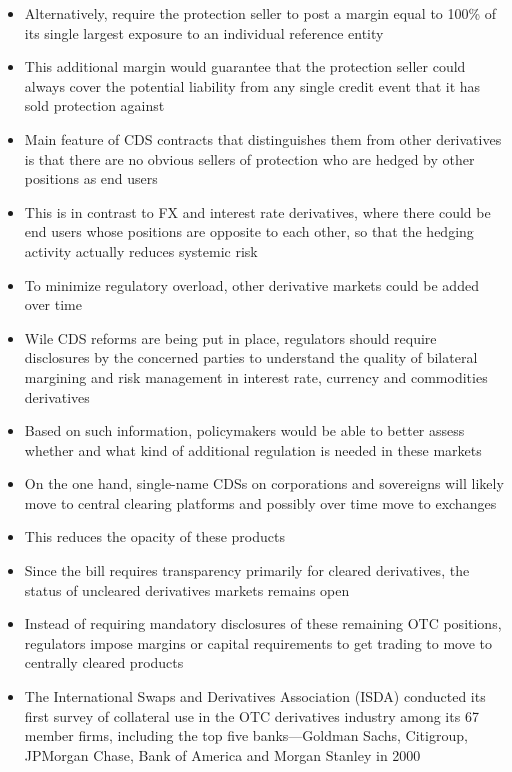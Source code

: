 \documentclass[11pt]{beamer}
\begin{document}
\begin{frame}
\begin{itemize}
\item Alternatively, require the protection seller to post a margin equal to 100\% of its single largest exposure to an individual reference entity
\item This additional margin would guarantee that the protection seller could always cover the potential liability from any single credit event that it has sold protection against
\item Main feature of CDS contracts that distinguishes them from other
derivatives is that there are no obvious sellers of protection who are hedged by other positions as end users
\item This is in contrast to FX and interest rate derivatives, where there could be end users whose positions are opposite to each other, so that the hedging activity actually reduces systemic risk
\end{itemize}
\end{frame}

\begin{frame}
\begin{itemize}
\item To minimize regulatory overload, other derivative markets could be added over time
\item Wile CDS reforms are being put in place, regulators should require disclosures by the concerned parties to understand the quality
of bilateral margining and risk management in interest rate, currency and commodities derivatives
\item Based on such information, policymakers would be able to better assess whether and what kind of additional regulation is needed in these markets
\end{itemize}
\end{frame}

\begin{frame}
\begin{itemize}
\item On the one hand, single-name CDSs on corporations and sovereigns will likely move to central clearing platforms and possibly over time move to exchanges
\item This reduces the opacity of these products
\item Since the bill requires transparency primarily for cleared derivatives, the status of uncleared derivatives markets remains open \item Instead of requiring mandatory disclosures of these remaining OTC positions, regulators impose margins or capital requirements to get trading to move to centrally cleared products
\item The International Swaps and Derivatives Association (ISDA) conducted its first survey of collateral use in the OTC derivatives industry among its 67 member firms, including the top five banks—Goldman Sachs, Citigroup, JPMorgan Chase, Bank of America and Morgan Stanley in 2000
\end{itemize}
\end{frame}
\end{document}
